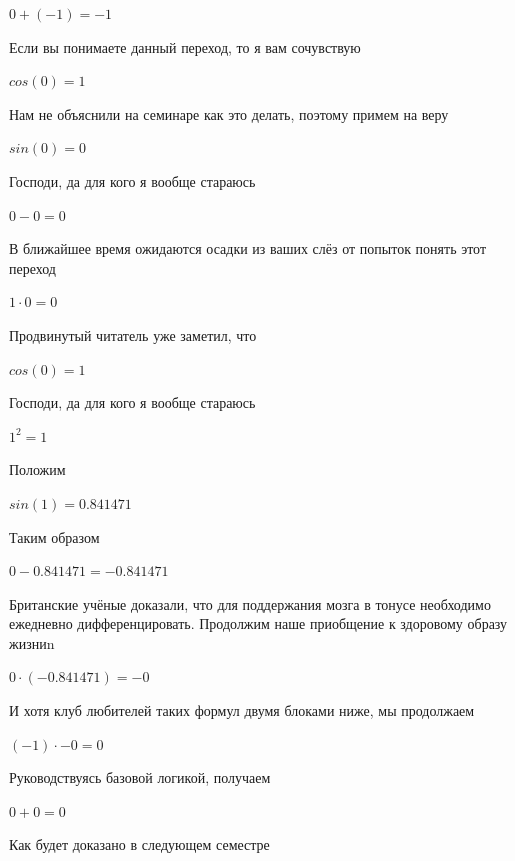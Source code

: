\documentclass[12pt,a4paper,fleqn]{article}
\begin{document}
\begin{center}$0+(-1) = -1$\end{center}
Если вы понимаете данный переход, то я вам сочувствую

\begin{center}$cos(0) = 1$\end{center}
Нам не объяснили на семинаре как это делать, поэтому примем на веру

\begin{center}$sin(0) = 0$\end{center}
Господи, да для кого я вообще стараюсь

\begin{center}$0-0 = 0$\end{center}
В ближайшее время ожидаются осадки из ваших слёз от попыток понять этот переход

\begin{center}$1 \cdot 0 = 0$\end{center}
Продвинутый читатель уже заметил, что

\begin{center}$cos(0) = 1$\end{center}
Господи, да для кого я вообще стараюсь

\begin{center}$1^{2} = 1$\end{center}
Положим

\begin{center}$sin(1) = 0.841471$\end{center}
Таким образом

\begin{center}$0-0.841471 = -0.841471$\end{center}
Британские учёные доказали, что для поддержания мозга в тонусе необходимо ежедневно дифференцировать. Продолжим наше приобщение к здоровому образу жизниn

\begin{center}$0 \cdot (-0.841471) = -0$\end{center}
И хотя клуб любителей таких формул двумя блоками ниже, мы продолжаем

\begin{center}$(-1) \cdot -0 = 0$\end{center}
Руководствуясь базовой логикой, получаем

\begin{center}$0+0 = 0$\end{center}
Как будет доказано в следующем семестре
\end{document}
